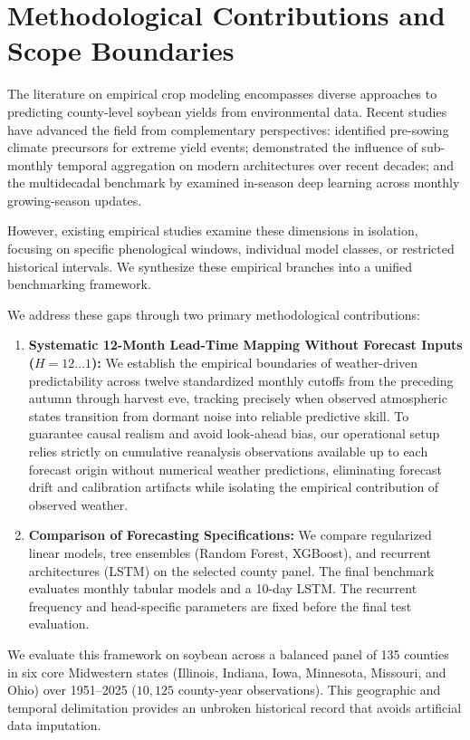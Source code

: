 \section{Methodological Contributions and Scope Boundaries}
\label{sec:intro_contributions}

The literature on empirical crop modeling encompasses diverse approaches to predicting county-level soybean yields from environmental data. Recent studies have advanced the field from complementary perspectives: \citet{Vijverberg2023} identified pre-sowing climate precursors for extreme yield events; \citet{Yinetal2026} demonstrated the influence of sub-monthly temporal aggregation on modern architectures over recent decades; and the multidecadal benchmark by \citet{ChenZhang2026} examined in-season deep learning across monthly growing-season updates.

However, existing empirical studies examine these dimensions in isolation, focusing on specific phenological windows, individual model classes, or restricted historical intervals. We synthesize these empirical branches into a unified benchmarking framework.

We address these gaps through two primary methodological contributions:
\begin{enumerate}
    \item \textbf{Systematic 12-Month Lead-Time Mapping Without Forecast Inputs ($H=12 \dots 1$):} We establish the empirical boundaries of weather-driven predictability across twelve standardized monthly cutoffs from the preceding autumn through harvest eve, tracking precisely when observed atmospheric states transition from dormant noise into reliable predictive skill. To guarantee causal realism and avoid look-ahead bias, our operational setup relies strictly on cumulative reanalysis observations available up to each forecast origin without numerical weather predictions, eliminating forecast drift and calibration artifacts while isolating the empirical contribution of observed weather.
    \item \textbf{Comparison of Forecasting Specifications:} We compare regularized linear models, tree ensembles (Random Forest, XGBoost), and recurrent architectures (LSTM) on the selected county panel. The final benchmark evaluates monthly tabular models and a 10-day LSTM. The recurrent frequency and head-specific parameters are fixed before the final test evaluation.
\end{enumerate}

We evaluate this framework on soybean across a balanced panel of 135 counties in six core Midwestern states (Illinois, Indiana, Iowa, Minnesota, Missouri, and Ohio) over 1951--2025 ($10{,}125$ county-year observations). This geographic and temporal delimitation provides an unbroken historical record that avoids artificial data imputation.

